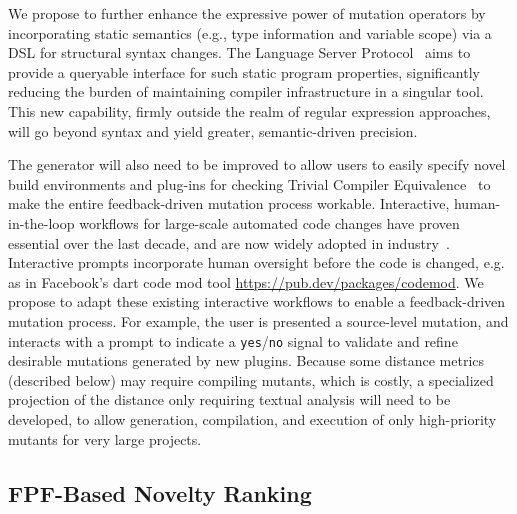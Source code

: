 We propose to further enhance the expressive power of mutation operators by
incorporating static semantics (e.g., type information and variable scope) via a
DSL for structural syntax changes. The Language Server Protocol~\cite{lsp-web} aims to
provide a queryable interface for such static program properties, significantly
reducing the burden of maintaining compiler infrastructure in a singular tool.
This new capability, firmly outside the realm of regular
expression approaches, will go beyond syntax and yield greater, semantic-driven precision.

The generator will also need to be improved to allow users to easily specify
novel build environments and plug-ins for checking Trivial Compiler
Equivalence~\cite{TCE} to make the entire feedback-driven mutation process
workable. Interactive, human-in-the-loop workflows for large-scale automated
code changes have proven essential over the last decade, and are now widely
adopted in industry~\cite{codemod-gh,
  codemod-fb-post-by-codemod-author, dart-codemod}. Interactive
prompts incorporate human oversight before the code is changed,
e.g. as in Facebook's dart code mod tool \url{https://pub.dev/packages/codemod}. 
We propose to adapt these existing interactive workflows to enable a
feedback-driven mutation process. For example, the user is presented a source-level mutation, and interacts with a prompt to indicate a {\tt yes}/{\tt no} signal
to validate and refine desirable mutations generated by new plugins.
 Because some distance
metrics (described below) may require compiling mutants, which is costly, a specialized
projection of the distance only requiring textual analysis will need
to be developed, to allow generation, compilation, and execution of
only high-priority mutants for very large projects.


\subsection{FPF-Based Novelty Ranking}
\label{sec:fpfplan}



